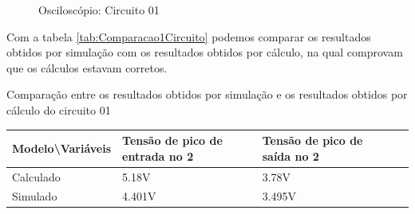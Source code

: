 \begin{figure}[H]
    \centering
    \caption{Osciloscópio: Circuito 01}
    \vspace{-0.3cm}
    \label{fig:OsciloscopioCircuito01}
\end{figure}

Com a tabela \ref{tab:Comparacao1Circuito} podemos comparar os resultados obtidos por simulação com os resultados obtidos por cálculo, na qual comprovam que os cálculos estavam corretos.

\begin{quadro}[H]
    \centering
    \caption{Comparação entre os resultados obtidos por simulação e os resultados obtidos por cálculo do circuito 01}
    \begin{tabular}{|C{0.19\textwidth}|C{0.24\textwidth}|C{0.24\textwidth}|C{0.24\textwidth}|C{0.24\textwidth}|}
        \hline
        \textbf{Modelo\textbackslash{}Variáveis} & \textbf{Tensão de pico de entrada no 2} & \textbf{Tensão de pico de saída no 2} \\
        \hline
        Calculado & 5.18V & 3.78V \\
        \hline
        Simulado & 4.401V & 3.495V \\
        \hline
    \end{tabular}
    \vspace{-0.6cm}
    \label{tab:Comparacao1Circuito}
\end{quadro}

